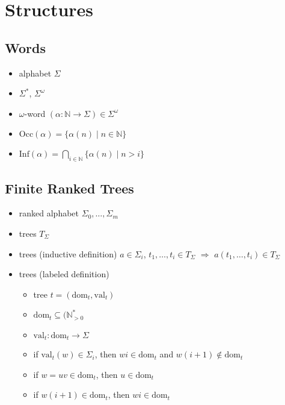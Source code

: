 \documentclass{article}
\begin{document}
\section{Structures}
\subsection{Words}
\begin{itemize}
	\item alphabet $\Sigma$
	\item $\Sigma^*$, $\Sigma^\omega$
	\item $\omega$-word $(\alpha : \mathbb{N} \rightarrow \Sigma) \in \Sigma^\omega$
	\item $\text{Occ}(\alpha) = \{ \alpha(n) \mid n \in \mathbb{N} \}$
	\item $\text{Inf}(\alpha) = \bigcap\limits_{i \in \mathbb{N}} \{ \alpha(n) \mid n > i \}$
\end{itemize}

\subsection{Finite Ranked Trees}
\begin{itemize}
	\item ranked alphabet $\Sigma_0, \dots, \Sigma_m$
	\item trees $T_\Sigma$
	\item trees (inductive definition) 
		$a \in \Sigma_i$, $t_1, \dots, t_i \in T_\Sigma$ $\Rightarrow$ $a(t_1, \dots, t_i) \in T_\Sigma$
	\item trees (labeled definition) 
		\begin{itemize}
			\item tree $t = (\text{dom}_t, \text{val}_t)$
			\item $\text{dom}_t \subseteq (\mathbb{N}_{> 0}^*$
			\item $\text{val}_t : \text{dom}_t \rightarrow \Sigma$
			\item if $\text{val}_t(w) \in \Sigma_i$, then $wi \in \text{dom}_t$ and $w(i+1) \notin \text{dom}_t$
			\item if $w = uv \in \text{dom}_t$, then $u \in \text{dom}_t$
			\item if $w(i+1) \in \text{dom}_t$, then $wi \in \text{dom}_t$
		\end{itemize}
\end{itemize}
\end{document}
